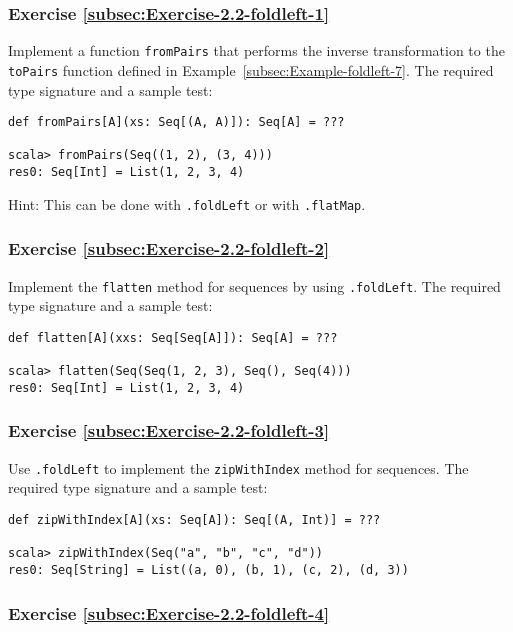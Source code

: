 \subsubsection{Exercise \label{subsec:Exercise-2.2-foldleft-1}\ref{subsec:Exercise-2.2-foldleft-1}}

Implement a function \lstinline!fromPairs! that performs the inverse
transformation to the \lstinline!toPairs! function defined in Example~\ref{subsec:Example-foldleft-7}.
The required type signature and a sample test:
\begin{lstlisting}
def fromPairs[A](xs: Seq[(A, A)]): Seq[A] = ???

scala> fromPairs(Seq((1, 2), (3, 4)))
res0: Seq[Int] = List(1, 2, 3, 4)
\end{lstlisting}

Hint: This can be done with \lstinline!.foldLeft! or with \lstinline!.flatMap!.

\subsubsection{Exercise \label{subsec:Exercise-2.2-foldleft-2}\ref{subsec:Exercise-2.2-foldleft-2}}

Implement the \lstinline!flatten! method for sequences by using \lstinline!.foldLeft!.
The required type signature and a sample test:
\begin{lstlisting}
def flatten[A](xxs: Seq[Seq[A]]): Seq[A] = ???

scala> flatten(Seq(Seq(1, 2, 3), Seq(), Seq(4)))
res0: Seq[Int] = List(1, 2, 3, 4)
\end{lstlisting}


\subsubsection{Exercise \label{subsec:Exercise-2.2-foldleft-3}\ref{subsec:Exercise-2.2-foldleft-3}}

Use \lstinline!.foldLeft! to implement the \lstinline!zipWithIndex!
method for sequences. The required type signature and a sample test:
\begin{lstlisting}
def zipWithIndex[A](xs: Seq[A]): Seq[(A, Int)] = ???

scala> zipWithIndex(Seq("a", "b", "c", "d"))
res0: Seq[String] = List((a, 0), (b, 1), (c, 2), (d, 3))
\end{lstlisting}


\subsubsection{Exercise \label{subsec:Exercise-2.2-foldleft-4}\ref{subsec:Exercise-2.2-foldleft-4}}

